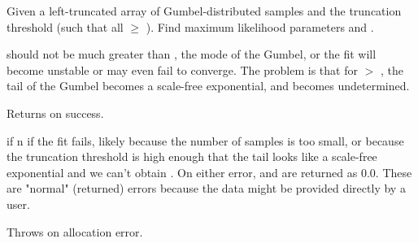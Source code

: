 \begin{sreapi}
Given a left-truncated array of Gumbel-distributed
samples  and the truncation threshold
 (such that all  $\geq$ ).
Find maximum likelihood parameters  and .

 should not be much greater than , the
mode of the Gumbel, or the fit will become unstable
or may even fail to converge. The problem is
that for  $>$ , the tail of the Gumbel
becomes a scale-free exponential, and  becomes
undetermined.

Returns  on success.

 if n if the fit fails, likely because the
number of samples  is too small, or because the
truncation threshold is high enough that the tail
looks like a scale-free exponential and we can't
obtain .
On either error,  and  are 
returned as 0.0.
These are "normal" (returned) errors because 
the data might be provided directly by a user.

Throws  on allocation error.           


\end{sreapi}

